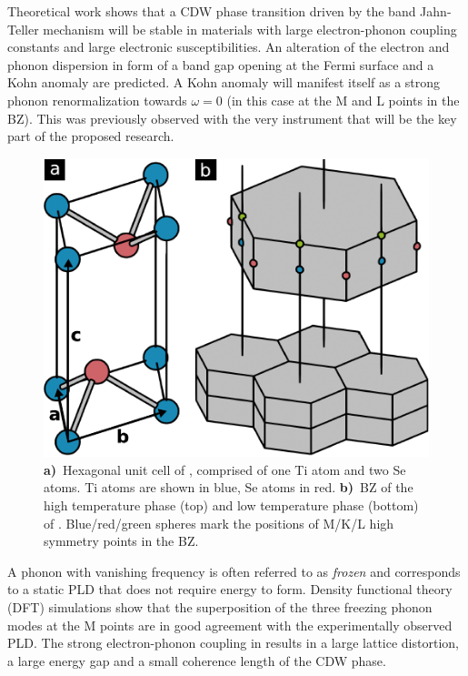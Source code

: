 Theoretical work shows that a \ac{CDW} phase transition driven by the band Jahn-Teller mechanism will be stable in materials with large electron-phonon coupling constants and large electronic susceptibilities\cite{friend1979}.
An alteration of the electron and phonon dispersion in form of a band gap opening at the Fermi surface and a Kohn anomaly are predicted.
A Kohn anomaly will manifest itself as a strong phonon renormalization towards $\omega=0$\cite{kohn1959} (in this case at the M and L points in the \ac{BZ}).
This was previously observed with the very instrument that will be the key part of the proposed research\cite{otto2021}.

\begin{figure}[!t]
	\begin{minipage}{0.5\columnwidth}
		\includegraphics[width=\columnwidth]{figs/tise2_crystal.pdf}
	\end{minipage}
	\hspace{0.04\columnwidth}
	\begin{minipage}{0.45\columnwidth}
		\caption{\textbf{a)}~Hexagonal unit cell of \ts, comprised of one Ti atom and two Se atoms. Ti atoms are shown in blue, Se atoms in red. \textbf{b)}~\ac{BZ} of the high temperature phase (top) and low temperature phase (bottom) of \ts. Blue/red/green spheres mark the positions of M/K/L high symmetry points in the \ac{BZ}.}
		\label{fig:crystal}
	\end{minipage}
\end{figure}

A phonon with vanishing frequency is often referred to as \emph{frozen} and corresponds to a static \ac{PLD} that does not require energy to form.
Density functional theory (DFT) simulations show that the superposition of the three freezing phonon modes at the M points are in good agreement with the experimentally observed \ac{PLD}\cite{kaneko2018}. %
The strong electron-phonon coupling in \ts\space results in a large lattice distortion, a large energy gap and a small coherence length of the \ac{CDW} phase\cite{haas1978,hildebrand2016}.

